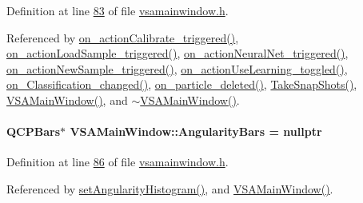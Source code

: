 Definition at line \hyperlink{vsamainwindow_8h_source_l00083}{83} of file \hyperlink{vsamainwindow_8h_source}{vsamainwindow.\+h}.



Referenced by \hyperlink{vsamainwindow_8cpp_source_l00516}{on\+\_\+action\+Calibrate\+\_\+triggered()}, \hyperlink{vsamainwindow_8cpp_source_l00475}{on\+\_\+action\+Load\+Sample\+\_\+triggered()}, \hyperlink{vsamainwindow_8cpp_source_l00353}{on\+\_\+action\+Neural\+Net\+\_\+triggered()}, \hyperlink{vsamainwindow_8cpp_source_l00361}{on\+\_\+action\+New\+Sample\+\_\+triggered()}, \hyperlink{vsamainwindow_8cpp_source_l00512}{on\+\_\+action\+Use\+Learning\+\_\+toggled()}, \hyperlink{vsamainwindow_8cpp_source_l00522}{on\+\_\+\+Classification\+\_\+changed()}, \hyperlink{vsamainwindow_8cpp_source_l00539}{on\+\_\+particle\+\_\+deleted()}, \hyperlink{vsamainwindow_8cpp_source_l00391}{Take\+Snap\+Shots()}, \hyperlink{vsamainwindow_8cpp_source_l00004}{V\+S\+A\+Main\+Window()}, and \hyperlink{vsamainwindow_8cpp_source_l00254}{$\sim$\+V\+S\+A\+Main\+Window()}.

\hypertarget{class_v_s_a_main_window_ac4dc27e6a351ad60f434357aeac9f1c0}{}
\paragraph[{Angularity\+Bars}]{\setlength{\rightskip}{0pt plus 5cm}Q\+C\+P\+Bars$\ast$ V\+S\+A\+Main\+Window\+::\+Angularity\+Bars = nullptr\hspace{0.3cm}{\ttfamily [private]}}\label{class_v_s_a_main_window_ac4dc27e6a351ad60f434357aeac9f1c0}


Definition at line \hyperlink{vsamainwindow_8h_source_l00086}{86} of file \hyperlink{vsamainwindow_8h_source}{vsamainwindow.\+h}.



Referenced by \hyperlink{vsamainwindow_8cpp_source_l00315}{set\+Angularity\+Histogram()}, and \hyperlink{vsamainwindow_8cpp_source_l00004}{V\+S\+A\+Main\+Window()}.

\hypertarget{class_v_s_a_main_window_ab30d8e8d4b71e2aaad2efa825286e64d}{}
